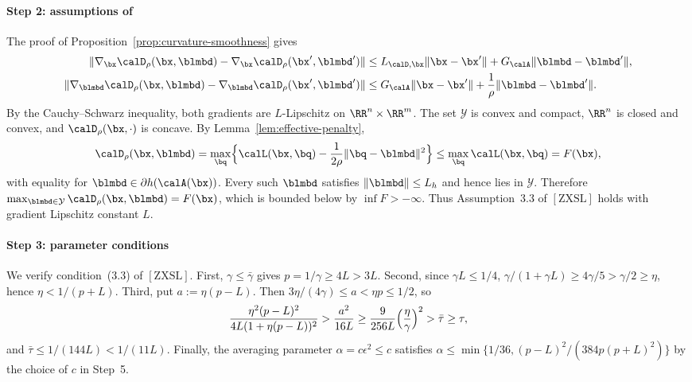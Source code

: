 \paragraph{Step 2: assumptions of~\cite[Theorem~3.4]{zhang2020smoothed}}
The proof of Proposition~\ref{prop:curvature-smoothness} gives
\[
\begin{aligned}
\|\nabla_{\bx}\calD_\rho(\bx,\blmbd)-\nabla_{\bx}\calD_\rho(\bx',\blmbd')\|
&\le L_{\calD,\bx}\|\bx-\bx'\|+G_{\calA}\|\blmbd-\blmbd'\|,\\
\|\nabla_{\blmbd}\calD_\rho(\bx,\blmbd)-\nabla_{\blmbd}\calD_\rho(\bx',\blmbd')\|
&\le G_{\calA}\|\bx-\bx'\|+\frac1\rho\|\blmbd-\blmbd'\|.
\end{aligned}
\]
By the Cauchy--Schwarz inequality, both gradients are \(L\)-Lipschitz on
\(\RR^n\times\RR^m\). The set \(\mathcal Y\) is convex and compact,
\(\RR^n\) is closed and convex, and \(\calD_\rho(\bx,\cdot)\) is concave. By
Lemma~\ref{lem:effective-penalty},
\[
\calD_\rho(\bx,\blmbd)
=\max_{\bq}\Bigl\{\calL(\bx,\bq)-\frac1{2\rho}\|\bq-\blmbd\|^2\Bigr\}
\le\max_{\bq}\calL(\bx,\bq)=F(\bx),
\]
with equality for \(\blmbd\in\partial h(\calA(\bx))\). Every such
\(\blmbd\) satisfies \(\|\blmbd\|\le L_h\) and hence lies in \(\mathcal Y\).
Therefore \(\max_{\blmbd\in\mathcal Y}\calD_\rho(\bx,\blmbd)=F(\bx)\), which
is bounded below by \(\inf F>-\infty\). Thus Assumption~3.3 of
\([\mathrm{ZXSL}]\) holds with gradient Lipschitz constant \(L\).

\paragraph{Step 3: parameter conditions}
We verify condition~(3.3) of \([\mathrm{ZXSL}]\). First,
\(\gamma\le\bar\gamma\) gives \(p=1/\gamma\ge4L>3L\). Second, since
\(\gamma L\le1/4\),
\(\gamma/(1+\gamma L)\ge4\gamma/5>\gamma/2\ge\eta\), hence
\(\eta<1/(p+L)\). Third, put \(a:=\eta(p-L)\). Then
\(3\eta/(4\gamma)\le a<\eta p\le1/2\), so
\[
\frac{\eta^2(p-L)^2}{4L(1+\eta(p-L))^2}
>\frac{a^2}{16L}
\ge\frac9{256L}\Bigl(\frac\eta\gamma\Bigr)^2
>\bar\tau\ge\tau,
\]
and \(\bar\tau\le1/(144L)<1/(11L)\). Finally, the averaging parameter
\(\alpha=c\epsilon^2\le c\) satisfies
\(\alpha\le\min\{1/36,(p-L)^2/(384p(p+L)^2)\}\) by the choice of \(c\) in
Step~5.

